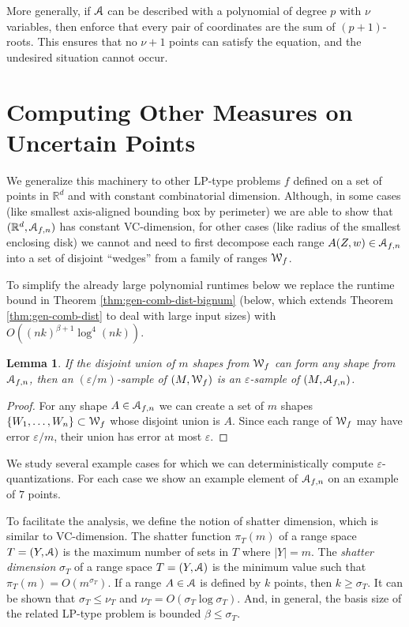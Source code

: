 \documentclass{journal}
\newcommand{\eps}{\varepsilon}
\newcommand{\Eu}[1]{\ensuremath{\EuScript{#1}}}
\newcommand{\R}{\ensuremath{\mathbb{R}}}
\newtheorem {lemma}[theorem]{Lemma}
\begin{document}
More generally, if $\Eu{A}$ can be described with a polynomial of degree $p$ with $\nu$ variables, then enforce that every pair of coordinates are the sum of $(p+1)$-roots.  This ensures that no $\nu+1$ points can satisfy the equation, and the undesired situation cannot occur.



\section {Computing Other Measures on Uncertain Points}
\label {app:moreexamples}
We generalize this machinery to other LP-type problems $f$ defined on a set of points in $\R^d$ and with constant combinatorial dimension.  Although, in some cases (like smallest axis-aligned bounding box by perimeter) we are able to show that $(\R^d, \Eu A_{f,n})$ has constant VC-dimension, for other cases (like radius of the smallest enclosing disk) we cannot and need to first decompose each range $A(Z, w) \in \Eu A_{f,n}$ into a set of disjoint ``wedges'' from a family of ranges $\Eu W_f$.

To simplify the already large polynomial runtimes below we replace the runtime bound in Theorem \ref{thm:gen-comb-dist-bignum} (below, which extends Theorem \ref{thm:gen-comb-dist} to deal with large input sizes) with $O((nk)^{\beta+1} \log^4(nk))$.


\begin{lemma}
If the disjoint union of $m$ shapes from $\Eu{W}_{f}$ can form any shape from $\Eu{A}_{f,n}$, then an $(\eps/m)$-sample of $(M, \Eu{W}_{f})$ is an $\eps$-sample of $(M, \Eu{A}_{f,n})$.
\end{lemma}
\begin{proof}
For any shape $A \in \Eu{A}_{f,n}$ we can create a set of $m$ shapes $\{W_1, \ldots, W_n\} \subset \Eu{W}_{f}$ whose disjoint union is $A$.  Since each range of $\Eu{W}_{f}$ may have error $\eps/m$, their union has error at most $\eps$.
\end{proof}

We study several example cases for which we can deterministically compute $\eps$-quantizations.  For each case we show an example element of $\Eu{A}_{f,n}$ on an example of $7$ points.

To facilitate the analysis, we define the notion of shatter dimension, which is similar to VC-dimension.  The shatter function $\pi_T(m)$ of a range space $T = (Y,\Eu A)$ is the maximum number of sets in $T$ where $|Y| = m$.  The \emph{shatter dimension} $\sigma_T$ of a range space $T = (Y,\Eu A)$ is the minimum value such that $\pi_T(m) = O(m^{\sigma_T})$.  If a range $A \in \Eu A$ is defined by $k$ points, then $k \geq \sigma_T$.  It can be shown \cite{HP} that $\sigma_T \leq \nu_T$ and $\nu_T = O(\sigma_T \log \sigma_T)$.
And, in general, the basis size of the related LP-type problem is bounded $\beta \leq \sigma_T$.
\end{document}
